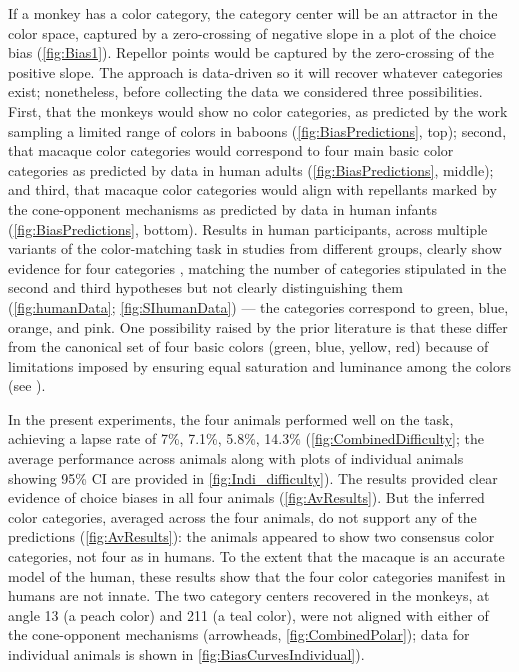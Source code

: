 If a monkey has a color category, the category center will be an attractor in the color space, captured by a zero-crossing of negative slope in a plot of the choice bias (\autoref{fig:Bias1}). 
Repellor points would be captured by the zero-crossing of the positive slope.
The approach is data-driven so it will recover whatever categories exist; nonetheless, before collecting the data we considered three possibilities. 
First, that the monkeys would show no color categories, as predicted by the work sampling a limited range of colors in baboons \citep{davidoff_cross-species_2010}
(\autoref{fig:BiasPredictions}, top);
second, that macaque color categories would correspond to  four main basic color categories as predicted by data in human adults (\autoref{fig:BiasPredictions}, middle); 
and third, that macaque color categories would align with repellants marked by the cone-opponent mechanisms as predicted by data in human infants \citep{skelton_biological_2017} (\autoref{fig:BiasPredictions}, bottom). 
Results in human participants, across multiple variants of the color-matching task in studies from different groups, clearly show evidence for four categories \citep{bae_why_2015,panichello_error-correcting_2019}, matching the number of categories stipulated in the second and third hypotheses but not clearly distinguishing them (\autoref{fig:humanData}; \autoref{fig:SIhumanData}) — the categories correspond to green, blue, orange, and pink. 
One possibility raised by the prior literature is that these differ from the canonical set of four basic colors (green, blue, yellow, red) because of limitations imposed by ensuring equal saturation and luminance among the colors (see \citep{bae_why_2015}). 

In the present experiments, the four animals performed well on the task, achieving a lapse rate of 7\%, 7.1\%, 5.8\%, 14.3\% (\autoref{fig:CombinedDifficulty}; the average performance across animals along with plots of individual animals showing 95\% CI are provided in \autoref{fig:Indi_difficulty}). %
The results provided clear evidence of choice biases in all four animals (\autoref{fig:AvResults}).
But the inferred color categories, averaged across the four animals, do not support any of the predictions (\autoref{fig:AvResults}): the animals appeared to show two consensus color categories, not four as in humans. 
To the extent that the macaque is an accurate model of the human, these results show that the four color categories manifest in humans are not innate. 
The two category centers recovered in the monkeys, at angle 13 (a peach color) and 211 (a teal color), were not aligned with either of the cone-opponent mechanisms (arrowheads, \autoref{fig:CombinedPolar}); data for individual animals is shown in \autoref{fig:BiasCurvesIndividual}).

